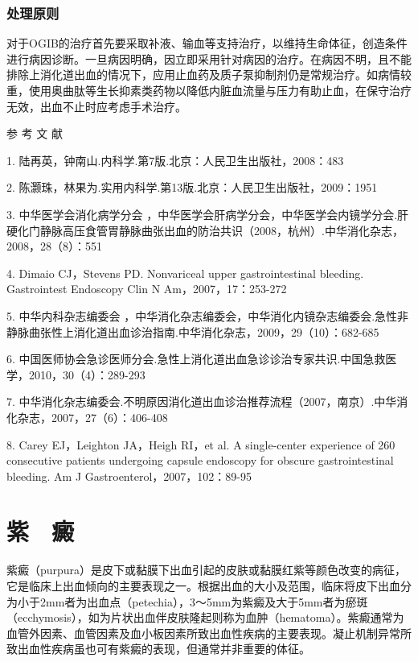 \subsection{处理原则}

对于OGIB的治疗首先要采取补液、输血等支持治疗，以维持生命体征，创造条件进行病因诊断。一旦病因明确，因立即采用针对病因的治疗。在病因不明，且不能排除上消化道出血的情况下，应用止血药及质子泵抑制剂仍是常规治疗。如病情较重，使用奥曲肽等生长抑素类药物以降低内脏血流量与压力有助止血，在保守治疗无效，出血不止时应考虑手术治疗。

\protect\hypertarget{text00035.html}{}{}

\hypertarget{text00035.htmlux5cux23CHP1-13-4}{}
参 考 文 献

1. 陆再英，钟南山.内科学.第7版.北京：人民卫生出版社，2008：483

2. 陈灏珠，林果为.实用内科学.第13版.北京：人民卫生出版社，2009：1951

3. 中华医学会消化病学分会
，中华医学会肝病学分会，中华医学会内镜学分会.肝硬化门静脉高压食管胃静脉曲张出血的防治共识（2008，杭州）.中华消化杂志，2008，28（8）：551

4. Dimaio CJ，Stevens PD. Nonvariceal upper gastrointestinal bleeding.
Gastrointest Endoscopy Clin N Am，2007，17：253-272

5. 中华内科杂志编委会
，中华消化杂志编委会，中华消化内镜杂志编委会.急性非静脉曲张性上消化道出血诊治指南.中华消化杂志，2009，29（10）：682-685

6.
中国医师协会急诊医师分会.急性上消化道出血急诊诊治专家共识.中国急救医学，2010，30（4）：289-293

7.
中华消化杂志编委会.不明原因消化道出血诊治推荐流程（2007，南京）.中华消化杂志，2007，27（6）：406-408

8. Carey EJ，Leighton JA，Heigh RI，et al. A single-center experience of
260 consecutive patients undergoing capsule endoscopy for obscure
gastrointestinal bleeding. Am J Gastroenterol，2007，102：89-95

\protect\hypertarget{text00036.html}{}{}

\chapter{紫　癜}

紫癜（purpura）是皮下或黏膜下出血引起的皮肤或黏膜红紫等颜色改变的病征，它是临床上出血倾向的主要表现之一。根据出血的大小及范围，临床将皮下出血分为小于2mm者为出血点（petechia），3～5mm为紫癜及大于5mm者为瘀斑（ecchymosis），如为片状出血伴皮肤隆起则称为血肿（hematoma）。紫癜通常为血管外因素、血管因素及血小板因素所致出血性疾病的主要表现。凝止机制异常所致出血性疾病虽也可有紫癜的表现，但通常并非重要的体征。

